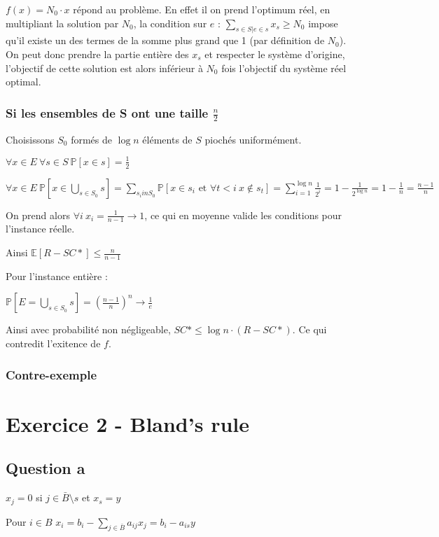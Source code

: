 \documentclass{article}
\newcommand{\PP}[1]{\mathbb{P}\left[ #1 \right ]}
\newcommand{\EE}[1]{\mathbb{E}\left[ #1 \right ]}
\begin{document}
$f(x)=N_0\cdot x$ répond au problème. En effet il on prend l'optimum réel, en multipliant la solution par $N_0$, la condition sur $e$ :  $\sum_{s \in S | e \in s} x_s \geq N_0$ impose qu'il existe un des termes de la somme plus grand que 1 (par définition de $N_0$). On peut donc prendre la partie entière des $x_s$ et respecter le système d'origine, l'objectif de cette solution est alors inférieur à $N_0$ fois l'objectif du système réel optimal.

\subsubsection*{Si les ensembles de S ont une taille $\frac{n}{2}$}

Choisissons $S_0$ formés de $\log n$ éléments de $S$ piochés uniformément.

$\forall x \in E \ \forall s \in S \ \PP{x \in s}=\frac{1}{2}$

$\forall x \in E \ \PP{x \in \bigcup_{s\in S_0} s}=\sum_{s_i in S_0}\PP{x \in s_i \text{ et } \forall t<i\ x \notin s_t }=\sum_{i=1}^{\log n}{\frac{1}{2^i}}=1-\frac{1}{2^{\log n}}=1-\frac{1}{n}=\frac{n-1}{n}$

On prend alors $\forall i\ x_i=\frac{1}{n-1}\rightarrow 1$, ce qui en moyenne valide les conditions pour l'instance réelle.

Ainsi $\EE{R-SC*}\leq \frac{n}{n-1}$

Pour l'instance entière :

$\PP{E=\bigcup_{s\in S_0} s}={\left(\frac{n-1}{n}\right)}^n \rightarrow \frac{1}{e}$

Ainsi avec probabilité non négligeable, $SC* \leq \log n  \cdot (R-SC*)$. Ce qui contredit l'exitence de $f$.

\subsubsection*{Contre-exemple}

\section*{Exercice 2 - Bland's rule}
\subsection*{Question a}

$x_j=0$ si $j\in \bar{B}\setminus s$ et $x_s=y$

Pour $i \in B$ $x_i=b_i-\sum_{j\in\bar{B}}a_{ij}x_j= b_i-a_{is}y$
\end{document}
